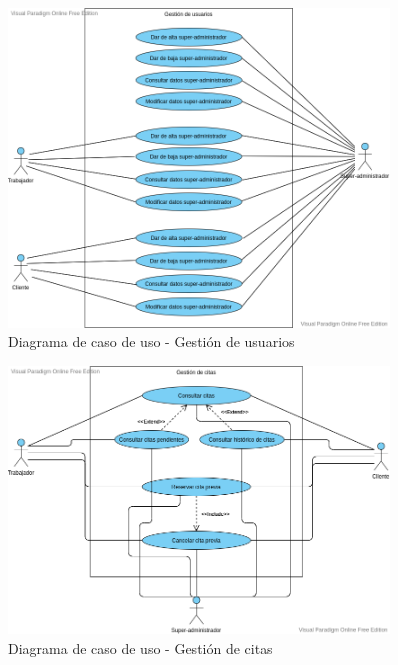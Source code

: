\begin{figure}[H]
    \centering
    \includegraphics[width=0.9\textwidth]{images/Gestion_Usuarios.png}
    \caption{Diagrama de caso de uso - Gestión de usuarios}
    \label{CU1}
\end{figure}

\begin{figure}[H]
    \centering
    \includegraphics[width=0.9\textwidth]{images/Gestion_Citas.png}
    \caption{Diagrama de caso de uso - Gestión de citas}
    \label{CU1}
\end{figure}

